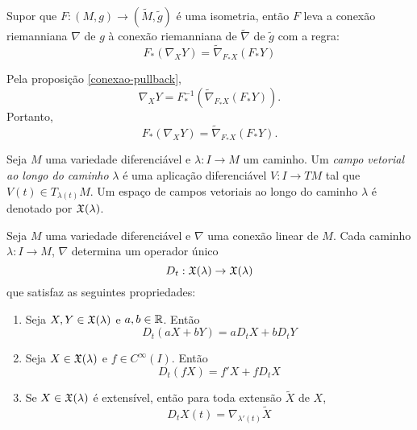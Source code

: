 \begin{proposicao}
	Supor que $F: (M,g) \rightarrow (\tilde{M}, \tilde{g})$ é uma isometria, então $F$ leva a conexão riemanniana $\nabla$ de $g$ à conexão riemanniana de $\tilde{\nabla}$ de $\tilde{g}$ com a regra:
	\begin{equation*}
		F_* (\nabla_X Y) = \tilde{\nabla}_{F_* X} (F_* Y)
	\end{equation*}
\end{proposicao}

\begin{demonstracao}
	Pela proposição \ref{conexao-pullback}, 
	\begin{equation*}
		\nabla_X Y = F^{-1}_* \left( \tilde{\nabla}_{F_* X} (F_* Y) \right).
	\end{equation*}
	Portanto,
	\begin{equation*}
		F_* (\nabla_X Y) = \tilde{\nabla}_{F_* X} (F_* Y).
	\end{equation*}
\end{demonstracao}

\begin{definicao}
	Seja $M$ uma variedade diferenciável e
	$\lambda: I \rightarrow M$ um caminho.
	Um \emph{campo vetorial ao longo do caminho} $\lambda$ é uma aplicação diferenciável $V: I \rightarrow TM$ tal que $V(t) \in T_{\lambda(t)} M$.
	Um espaço de campos vetoriais ao longo do caminho $\lambda$ é denotado por $\mathfrak{X}(\lambda)$.
\end{definicao}

\begin{proposicao}\label{derivada-covariante-de-um-caminho}
	Seja $M$ uma variedade diferenciável e
	$\nabla$ uma conexão linear de $M$.
	Cada caminho $\lambda: I \rightarrow M$, $\nabla$ determina um operador único
	\begin{equation*}
		D_t: \mathfrak{X}(\lambda) \rightarrow \mathfrak{X}(\lambda)
	\end{equation*}
	que satisfaz as seguintes propriedades:
	\begin{enumerate}
		\item Seja $X,Y \in \mathfrak{X}(\lambda)$ e $a,b \in \mathbb R$. Então
		\begin{equation*}
			D_t(aX + bY) = a D_t X + b D_t Y
		\end{equation*}
		\item Seja $X \in \mathfrak{X}(\lambda)$ e $f \in C^{\infty}(I)$. Então
		\begin{equation*}
			D_t(fX) = f' X + f D_t X
		\end{equation*}
		\item Se $X \in \mathfrak{X}(\lambda)$ é extensível, então para toda extensão $\tilde{X}$ de $X$,
		\begin{equation*}
			D_t X(t) = \nabla_{\lambda'(t)} \tilde{X}
		\end{equation*}
	\end{enumerate}
\end{proposicao}

